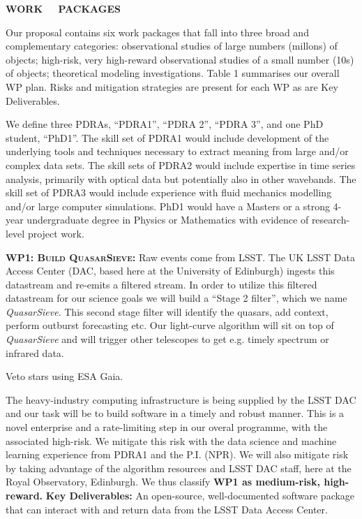 \smallskip
\smallskip
\noindent
{\bf  WORK  $\;\;\;$  PACKAGES} 

\smallskip
\smallskip
\noindent
Our proposal contains six work packages that fall into three broad
and complementary categories: observational studies of large numbers
(millons) of objects; high-risk, very high-reward observational
studies of a small number (10s) of objects; theoretical modeling
investigations. Table 1 summarises our overall WP plan. Risks and
mitigation strategies are present for each WP as are Key Deliverables.

\smallskip
\smallskip
\noindent
We define three PDRAs, ``PDRA1'', ``PDRA 2'', ``PDRA 3'', and one PhD
student, ``PhD1''.  The skill set of PDRA1 would include development
of the underlying tools and techniques necessary to extract meaning
from large and/or complex data sets.  The skill sets of PDRA2 would
include expertise in time series analysis, primarily with optical
data but potentially also in other wavebands.  The skill set of PDRA3
would include experience with fluid mechanics modelling and/or large
computer simulations.  PhD1 would have a Masters or a strong 4-year
undergraduate degree in Physics or Mathematics with evidence of
research-level project work.


\smallskip
\smallskip
\noindent
\textbf{\textsc{WP1: Build QuasarSieve:}} 
Raw events come from LSST. The UK LSST Data Access Center (DAC, based
here at the University of Edinburgh) ingests this datastream and
re-emits a filtered stream. In order to utilize this filtered
datastream for our science goals we will build a ``Stage 2 filter'',
which we name {\it QuasarSieve}.  This second stage filter will
identify the quasars, add context, perform outburst forecasting etc.
Our light-curve algorithm will sit on top of {\it QuasarSieve} and
will trigger other telescopes to get e.g. timely spectrum or infrared
data.

\smallskip
\smallskip
\noindent
Veto stars using ESA Gaia. 


\smallskip
\smallskip
\noindent
The heavy-industry computing infrastructure is being supplied by the
LSST DAC and our task will be to build software in a timely and robust
manner.  This is a novel enterprise and a rate-limiting step in our
overal programme, with the associated high-risk.  We mitigate this
risk with the data science and machine learning experience from PDRA1
and the P.I. (NPR).  We will also mitigate risk by taking advantage of
the algorithm resources and LSST DAC staff, here at the Royal
Observatory, Edinburgh.  We thus classify {\bf WP1 as medium-risk,
high-reward.}  {\bf Key Deliverables:} An open-source, well-documented
software package that can interact with and return data from the LSST
Data Access Center.



